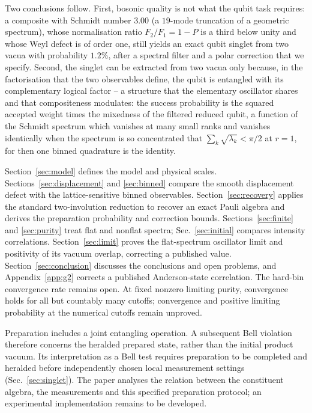 \documentclass[11pt,a4paper]{article}
\begin{document}
Two conclusions follow. First, bosonic quality is not what the qubit task requires: a composite with Schmidt number $3.00$ (a $19$-mode truncation of a geometric spectrum), whose normalisation ratio $F_2/F_1=1-P$ is a third below unity and whose Weyl defect is of order one, still yields an exact qubit singlet from two vacua with probability $1.2\%$, after a spectral filter and a polar correction that we specify. Second, the singlet can be extracted from two vacua only because, in the factorisation that the two observables define, the qubit is entangled with its complementary logical factor -- a structure that the elementary oscillator shares and that compositeness modulates: the success probability is the squared accepted weight times the mixedness of the filtered reduced qubit, a function of the Schmidt spectrum which vanishes at many small ranks and vanishes identically when the spectrum is so concentrated that $\sum_k\sqrt{\lambda_k}<\pi/2$ at $r=1$, for then one binned quadrature is the identity.

Section~\ref{sec:model} defines the model and physical scales. Sections~\ref{sec:displacement} and \ref{sec:binned} compare the smooth displacement defect with the lattice-sensitive binned observables. Section~\ref{sec:recovery} applies the standard two-involution reduction \cite{Masanes2005,Kaniewski2016} to recover an exact Pauli algebra and derives the preparation probability and correction bounds. Sections~\ref{sec:finite} and \ref{sec:purity} treat flat and nonflat spectra; Sec.~\ref{sec:initial} compares intensity correlations. Section~\ref{sec:limit} proves the flat-spectrum oscillator limit and positivity of its vacuum overlap, correcting a published value. Section~\ref{sec:conclusion} discusses the conclusions and open problems, and Appendix~\ref{app:g2} corrects a published Anderson-state correlation. The hard-bin convergence rate remains open. At fixed nonzero limiting purity, convergence holds for all but countably many cutoffs; convergence and positive limiting probability at the numerical cutoffs remain unproved.

Preparation includes a joint entangling operation. A subsequent Bell violation therefore concerns the heralded prepared state, rather than the initial product vacuum. Its interpretation as a Bell test requires preparation to be completed and heralded before independently chosen local measurement settings (Sec.~\ref{sec:singlet}). The paper analyses the relation between the constituent algebra, the measurements and this specified preparation protocol; an experimental implementation remains to be developed.
\end{document}

